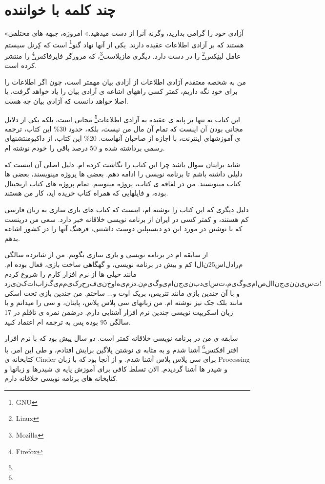 \documentclass[14pt,a4paper]{memoir}
\begin{document}
	 
	 \tableofcontents
	 \mainmatter
	 
	 \chapter{چند کلمه با خواننده} \label{foreword}

	«آزادی خود را گرامی بدارید، وگرنه آنرا از دست میدهید.»
	امروزه، جبهه های مختلفی هستند که بر آزادی اطلاعات عقیده دارند. یکی از آنها نهاد گنو\footnote{GNU} است که کِرنل سیستم عامل لینِکس\footnote{Linux} را در دست دارد. دیگری مازیلاست\footnote{Mozilla}، که مرورگر فایرفاکس\footnote{Firefox} را منتشر کرده است. 
	
	من به شخصه معتقدم آژادی اطلاعات از آزادی بیان مهمتر است، چون اگر اطلاعات را برای خود نگه داریم، کمتر کسی راههای اشاعه ی آزادی بیان را یاد خواهد گرفت، یا اصلا خواهد دانست که آژادی بیان چه هست. 
	
	این کتاب نه تنها بر پایه ی عقیده به آزادی اطلاعات\footnote{} مجانی است، بلکه یکی از دلایل مجانی بودن آن اینست که تمام آن مال من نیست، بلکه، حدود 30\% این کتاب، ترجمه ی آموزشهای اینترنت، با اجازه از صاحبان آنهاست. 20\% این کتاب، از داکیومنتشنهای رسمی برداشته شده  و 50 درصد باقی را خودم نوشته ام.
	
	شاید برایتان سوال باشد چرا این کتاب را نگاشت کرده ام. دلیل اصلی آن اینست که دلیلی داشته باشم تا برنامه نویسی را ادامه دهم. بعضی ها پروژه مینویسند، بعضی ها کتاب مینویسند. من در لفافه ی کتاب، پروژه مینوسم. تمام پروژه های کتاب اریجینال بوده، و فایلهایی که همراه کتاب خریده اید، کار من هستند.
	
	دلیل دیگری که این کتاب را نوشته ام، اینست که کتاب های بازی سازی به زبان فارسی کم هستند، و کمتر کسی در ایران از برنامه نویسی خلاقانه خبر دارد. سعی من درینست که با نوشتن در مورد این دو دیسیپلین دوست داشتنی، فرهنگ آنها را در کشور اشاعه بدهم.
	
	از سابقه ام در برنامه نویسی و بازی سازی بگویم. من از شانزده سالگی  \(الان 25 سال دارم \) کم و بیش در برنامه نویسی، و گهگاهی ساخت بازی، فعال بوده ام. مانند خیلی ها از نرم افزار  کارم را شروع کردم \(درین کتاب از گیم میکر حرفی نخواهیم زد. نمیگویم انجین بدی است، میگویم اصلا انجین نیست!\) و با آن چندین بازی مانند تتریس، بریک اوت و... ساختم. من چندین بازی تحت اسکی مانند بلک جک نیز نوشته ام. من زبانهای سی پلاس پلاس، پایتان، و سی را میدانم و با زبان اسکریپت نویسی چندین نرم افزار آشنایی دارم. درضمن نمره ی تافلم در 17 سالگی 95 بوده پس به ترجمه ام اعتماد کنید.
	
	سابقه ی من در برنامه نویسی خلاقانه کمتر است. دو سال پیش بود که با نرم افزار افتر افکتس\footnote{} آشنا شدم و به مثابه ی نوشتن پلاگین برایش افتادم، و طی این امر، با کتابخانه ی Cinder برای سی پلاس پلاس آشنا شدم. و از آنجا بود که با زبان Processing و شیدر ها آشنا گردیدم. الان تسلط کافی برای آموزش پایه ی شیدرها و زبانها و کتابخانه های برنامه نویسی خلاقانه دارم.
	
\end{document}
